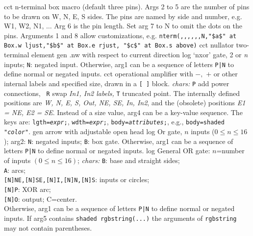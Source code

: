   {cct}%
  {n-terminal box macro (default three pins).
   Args 2 to 5 are the number of pins to be drawn on W, N, E, S
   sides.  The pins are named by side and number, e.g. W1, W2, N1,
   $\ldots$ Arg 6 is the pin length.  Set arg 7 to N to omit the
   dots on the pins. Arguments 1 and 8 allow customizations, e.g.
   {\tt nterm(,{,},{,},{,}N,"\$a\$" at Box.w ljust,"\$b\$" at Box.e rjust,
      "\$c\$" at Box.s above)} }%
%
  {cct}%
  { nullator two-terminal element }%
%
  {gen}%
  {.nw with respect to current direction}%
%
  {log}%
  {`nxor' gate, 2 or {\sl n\/} inputs; {\tt N}: negated input.
   Otherwise, arg1 can be a sequence of letters {\tt P|N} to define
   normal or negated inputs.
    }%
%
%
%
  {cct}%
  {operational amplifier with $-,$ $+$ or other internal labels and
    specified size, drawn in a {\tt [ ]} block.
    {\sl chars:} {\tt P} add power connections, {\tt
    R} swap {\sl In1, In2 labels,} {\tt T} truncated point.  The internally
    defined positions are {\sl W, N, E, S, Out, NE, SE, In, In2}, and
    the (obsolete) positions {\sl E1 = NE, E2 = SE}. Instead of a size
    value, arg4 can be a key-value sequence.  The keys are:
    {\tt lgth={\sl expr};}, 
    {\tt wdth={\sl expr};}, 
    {\tt body={\sl attributes};}, e.g., {\tt body=shaded "{\sl color}"}. 
   }%
%
  {gen}%
  {arrow with adjustable open head}%
%
  {log}%
  {Or gate, $n$ inputs ($0 \leq n \leq 16$); arg2: {\tt N}: negated inputs;
   {\tt B}: box gate.
   Otherwise, arg1 can be a sequence of letters {\tt P|N} to define
   normal or negated inputs.
    }%
%
  {log}%
  {General OR gate: $n$=number of inputs $(0\leq n\leq 16)$;
    {\sl chars:}%
    {\tt B}: base and straight sides;\\ 
    {\tt A}: arcs;\\
    {\tt [N]NE,[N]SE,[N]I,[N]N,[N]S}: inputs or circles;\\ 
    {\tt [N]P}: XOR arc;\\
    {\tt [N]O}: output; C=center.\\
   Otherwise, arg1 can be a sequence of letters {\tt P|N} to define
   normal or negated inputs.  If arg5 contains {\tt shaded rgbstring(...)}%
   the arguments of {\tt rgbstring} may not contain parentheses.}%
